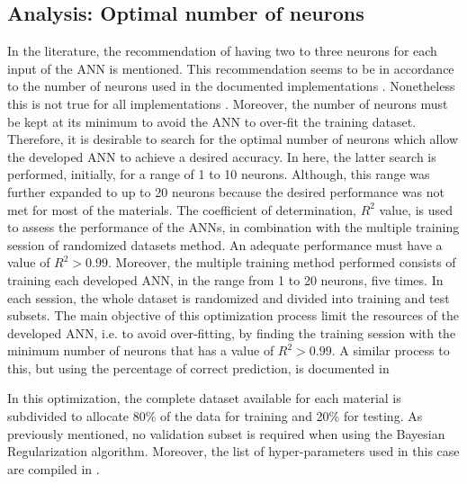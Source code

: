 \subsection{Analysis: Optimal number of neurons}

In the literature, the recommendation of having two to three neurons for each input of the ANN is mentioned. This recommendation seems to be in accordance to the number of neurons used in the documented implementations \cite{rodriguez2019application,kopal2018prediction,jenik2017sequential}. Nonetheless this is not true for all implementations \cite{yousef2011prediction,kopal2017modeling}. Moreover, the number of neurons must be kept at its minimum to avoid the ANN to over-fit the training dataset. Therefore, it is desirable to search for the optimal number of neurons which allow the developed ANN to achieve a desired accuracy. In here, the latter search is performed, initially, for a range of 1 to 10 neurons. Although, this range was further expanded to up to 20 neurons because the desired performance was not met for most of the materials. The coefficient of determination, $R^2$ value, is used to assess the performance of the ANNs, in combination with the multiple training session of randomized datasets method. An adequate performance must have a value of $R^2>0.99$. Moreover, the multiple training method performed consists of training each developed ANN, in the range from 1 to 20 neurons, five times. In each session, the whole dataset is randomized and divided into training and test subsets. The main objective of this optimization process limit the resources of the developed ANN, i.e. to avoid over-fitting, by finding the training session with the minimum number of neurons that has a value of $R^2>0.99$. A similar process to this, but using the percentage of correct prediction, is documented in \cite{zhang2002dynamic}

In this optimization, the complete dataset available for each material is subdivided to allocate 80\% of the data for training and 20\% for testing. As previously mentioned, no validation subset is required when using the Bayesian Regularization algorithm. Moreover, the list of hyper-parameters used in this case are compiled in .

